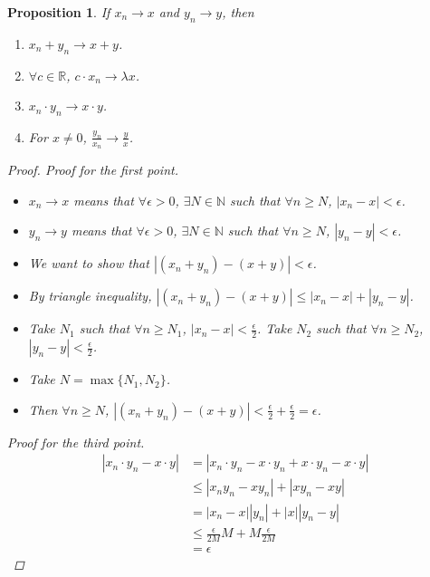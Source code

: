\documentclass[10pt]{article}
\newcommand{\N}{\mathbb{N}}
\newcommand{\R}{\mathbb{R}}
\newtheorem{proposition}[theorem]{Proposition}
\theoremstyle{definition}
\theoremstyle{remark}
\begin{document}
\begin{proposition}
    If $x_n \to x$ and $y_n \to y$, then
    \begin{enumerate}
        \item $x_n + y_n \to x + y$.
        \item $\forall c \in \R$, $c \cdot x_n \to \lambda x$.
        \item $x_n \cdot y_n \to x \cdot y$.
        \item For $x \neq 0$, $\frac{y_n}{x_n} \to \frac{y}{x}$.
    \end{enumerate}
    \begin{proof}
        Proof for the first point.
        \begin{itemize}
            \item $x_n \to x$ means that $\forall \epsilon > 0$, $\exists N \in \N$ such that $\forall n \geq N$, $|x_n - x| < \epsilon$.
            \item $y_n \to y$ means that $\forall \epsilon > 0$, $\exists N \in \N$ such that $\forall n \geq N$, $|y_n - y| < \epsilon$.
            \item We want to show that $|(x_n + y_n) - (x + y)| < \epsilon$.
            \item By triangle inequality, $|(x_n + y_n) - (x + y)| \leq |x_n - x| + |y_n - y|$.
            \item Take $N_1$ such that $\forall n \geq N_1$, $|x_n - x| < \frac{\epsilon}{2}$.
                Take $N_2$ such that $\forall n \geq N_2$, $|y_n - y| < \frac{\epsilon}{2}$.
            \item Take $N = \max\{N_1, N_2\}$.
            \item Then $\forall n \geq N$, $|(x_n + y_n) - (x + y)| < \frac{\epsilon}{2} + \frac{\epsilon}{2} = \epsilon$.
        \end{itemize}
        Proof for the third point.
        \begin{align*}
            |x_n \cdot y_n - x \cdot y| &= |x_n \cdot y_n - x \cdot y_n + x \cdot y_n - x \cdot y| \\
                                        &\leq |x_n y_n - x y_n| + |x y_n - x y| \\
                                        &= |x_n - x| |y_n| + |x| |y_n - y| \\
                                        &\leq \frac{\epsilon}{2M} M + M \frac{\epsilon}{2M} \\
                                        &= \epsilon
        \end{align*}

\end{proof}
\end{proposition}
\end{document}
